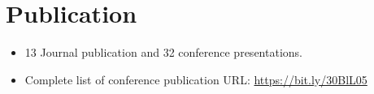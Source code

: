 \documentclass{my_cv}%
\begin{document}
\section{Publication}
\vspace{1em}
%
\begin{itemize}
    \item 13 Journal publication and 32 conference presentations.
    \item Complete list of conference publication URL: \href{https://bit.ly/30BlL05}{https://bit.ly/30BlL05}
\end{itemize}

\end{document}
